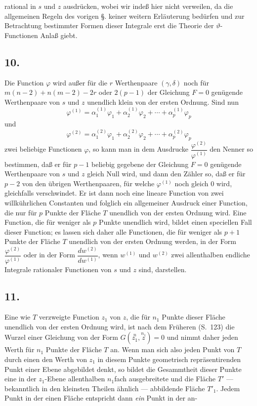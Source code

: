 \documentclass{article}
\begin{document}
rational in $s$ und $z$ ausdrücken, wobei wir indeß hier nicht verweilen, da die allgemeinen Regeln des vorigen §. keiner weitern Erläuterung bedürfen und zur Betrachtung bestimmter Formen dieser Integrale erst die Theorie der $\vartheta$-Functionen Anlaß giebt.

\subsection*{10.}

Die Function $\varphi$ wird außer für die $r$ Werthenpaare $(\gamma, \delta)$ noch für $m(n-2) + n(m-2) - 2r$ oder $2(p-1)$ der Gleichung $F = 0$ genügende Werthenpaare von $s$ und $z$ unendlich klein von der ersten Ordnung. Sind nun
\[ \varphi^{(1)} = \alpha_{1}^{(1)}\varphi_{1} + \alpha_{2}^{(1)}\varphi_{2} + \cdots + \alpha_{p}^{(1)}\varphi_{p} \]
und
\[ \varphi^{(2)} = \alpha_{1}^{(2)}\varphi_{1} + \alpha_{2}^{(2)}\varphi_{2} + \cdots + \alpha_{p}^{(2)}\varphi_{p} \]
zwei beliebige Functionen $\varphi$, so kann man in dem Ausdrucke $\dfrac{\varphi^{(2)}}{\varphi^{(1)}}$ den Nenner so bestimmen, daß er für $p-1$ beliebig gegebene der Gleichung $F = 0$ genügende Werthenpaare von $s$ und $z$ gleich Null wird, und dann den Zähler so, daß er für $p-2$ von den übrigen Werthenpaaren, für welche $\varphi^{(1)}$ noch gleich 0 wird, gleichfalls verschwindet. Er ist dann noch eine lineare Function von zwei willkührlichen Constanten und folglich ein allgemeiner Ausdruck einer Function, die nur für $p$ Punkte der Fläche $T$ unendlich von der ersten Ordnung wird. Eine Function, die für weniger als $p$ Punkte unendlich wird, bildet einen speciellen Fall dieser Function; es lassen sich daher alle Functionen, die für weniger als $p+1$ Punkte der Fläche $T$ unendlich von der ersten Ordnung werden, in der Form $\dfrac{\varphi^{(2)}}{\varphi^{(1)}}$ oder in der Form $\dfrac{dw^{(2)}}{dw^{(1)}}$, wenn $w^{(1)}$ und $w^{(2)}$ zwei allenthalben endliche Integrale rationaler Functionen von $s$ und $z$ sind, darstellen.

\subsection*{11.}

Eine wie $T$ verzweigte Function $z_{1}$ von $z$, die für $n_{1}$ Punkte dieser Fläche unendlich von der ersten Ordnung wird, ist nach dem Früheren (S.~123) die Wurzel einer Gleichung von der Form $G(\overset{n}{z_{1}}, \overset{n_{1}}{z}) = 0$ und nimmt daher jeden Werth für $n_{1}$ Punkte der Fläche $T$ an. Wenn man sich also jeden Punkt von $T$ durch einen den Werth von $z_{1}$ in diesem Punkte geometrisch repräsentirenden Punkt einer Ebene abgebildet denkt, so bildet die Gesammtheit dieser Punkte eine in der $z_{1}$-Ebene allenthalben $n_{1}$fach ausgebreitete und die Fläche $T'$ --- bekanntlich in den kleinsten Theilen ähnlich --- abbildende Fläche $T'_{1}$. Jedem Punkt in der einen Fläche entspricht dann \emph{ein} Punkt in der an-
\end{document}
